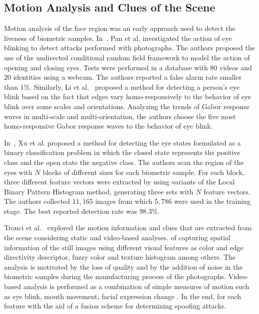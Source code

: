 \documentclass[journal]{IEEEtran}
\providecommand{\rv}[1]{{\protect\color{black}{#1}}}
\begin{document}
\subsection{Motion Analysis and Clues of the Scene}
Motion analysis of the face region was an early approach used to detect the liveness of biometric samples. In~\cite{Pan:ICCV:2007}, Pan et al. investigated the action of eye blinking to detect attacks performed with photographs. The authors proposed the use of the undirected conditional random field framework to model the action of opening and closing eyes. Tests were performed in a database with $80$ videos and $20$ identities using a webcam. The authors reported a false alarm rate smaller than $1\%$. Similarly, Li et al.~\cite{Li:ICMLC:2008} proposed a method for detecting a person's eye blink based on the fact that edges vary homo-responsively to the behavior of eye blink over some scales and orientations. Analyzing the trends of Gabor response waves in multi-scale and multi-orientation, the authors choose the five most homo-responsive Gabor response waves to the behavior of eye blink. 

In~\cite{Xu:ICIP:2008}, Xu et al. proposed a method for detecting the eye states formulated as a binary classification problem in which the closed state represents the positive class and the open state the negative class. The authors scan the region of the eyes with $N$ blocks of different sizes for each biometric sample. For each block, three different feature vectors were extracted by using variants of the Local Binary Pattern Histogram method, generating three sets with $N$ feature vectors. The authors collected $11,165$ images from which $5,786$ were used in the training stage. The best reported detection rate was $98.3\%$.

Tronci et al.~\cite{Tronci:IJCB:2011} explored the motion information and clues that are extracted from the scene considering static and video-based analyses. \rv{A static analysis consists} of capturing spatial information of the still images using different visual features as color and edge directivity descriptor, fuzzy color and texture histogram among others. The analysis is motivated by the loss of quality and by the addition of noise in the biometric samples during the manufacturing process of the photographs. Video-based analysis is performed as a combination of simple measures of motion such as eye blink, mouth movement, facial expression change \rv{among others}. In the end, \rv{a classifier is trained} for each feature with the aid of a fusion scheme  for determining spoofing attacks.
\end{document}
